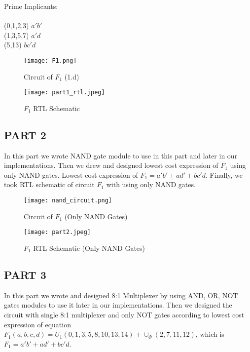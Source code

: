 \documentclass[pdftex,12pt,a4paper]{article}
\begin{document}
Prime Implicants:\\
\\
(0,1,2,3) \(a'b'\)\\
(1,3,5,7) \(a'd\)\\
(5,13) \(bc'd\)\\

\begin{figure}[ht]
	\centering
	\texttt{[image: F1.png]}	
	\caption{Circuit of \(F_1\) (1.d)}
	\label{fig4}
\end{figure}

\begin{figure}[ht]
	\centering
	\texttt{[image: part1\_rtl.jpeg]}	
	\caption{\(F_1\) RTL Schematic}
	\label{fig4}
\end{figure}
\clearpage
\subsection{PART 2}
In this part we wrote NAND gate module to use in this part and later in our implementations.  Then we drew and designed lowest cost expression of \(F_1\) using only NAND gates.
Lowest cost expression of \(F_1 = a'b' + ad' + bc'd\). 
Finally, we took RTL schematic of circuit \(F_1\) with using only NAND gates.


\begin{figure}[ht]
	\centering
	\texttt{[image: nand\_circuit.png]}	
	\caption{Circuit of \(F_1\) (Only NAND Gates)}
	\label{fig5}
\end{figure}

\begin{figure}[ht]
	\centering
	\texttt{[image: part2.jpeg]}	
	\caption{\(F_1\) RTL Schematic (Only NAND Gates)}
	\label{fig6}
\end{figure}

\clearpage

\subsection{PART 3}

In this part we wrote and designed 8:1 Multiplexer by using AND, OR, NOT gates modules to use it later in our implementations. Then we designed the circuit with single 8:1 multiplexer and only NOT gates according to lowest cost expression of equation \(F_1(a, b, c, d) = U_1(0, 1, 3, 5, 8, 10, 13, 14) + \cup_\Phi(2, 7, 11, 12)\), which is \(F_1 = a'b' + ad' + bc'd\). 
\end{document}

